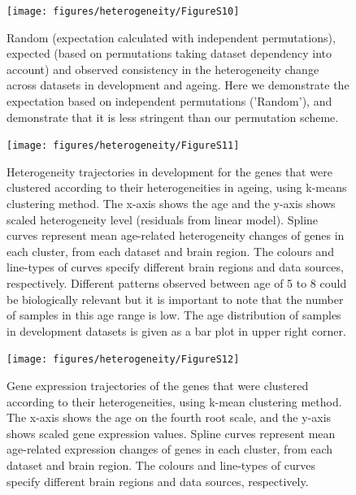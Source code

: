 \documentclass[12pt,twoside]{unicam}
\begin{document}
\begin{figure}

{\centering \texttt{[image: figures/heterogeneity/FigureS10]} 

}

\caption[Random, expected, and observed consistency in the heterogeneity change across datasets in development and ageing.]{Random (expectation calculated with independent permutations), expected (based on permutations taking dataset dependency into account) and observed consistency in the heterogeneity change across datasets in development and ageing. Here we demonstrate the expectation based on independent permutations ('Random'), and demonstrate that it is less stringent than our permutation scheme.}\label{fig:hetFigS10}
\end{figure}

\begin{figure}

{\centering \texttt{[image: figures/heterogeneity/FigureS11]} 

}

\caption[Heterogeneity trajectories in development for the genes that were clustered according to their heterogeneity levels in ageing.]{Heterogeneity trajectories in development for the genes that were clustered according to their heterogeneities in ageing, using k-means clustering method. The x-axis shows the age and the y-axis shows scaled heterogeneity level (residuals from linear model). Spline curves represent mean age-related heterogeneity changes of genes in each cluster, from each dataset and brain region. The colours and line-types of curves specify different brain regions and data sources, respectively. Different patterns observed between age of 5 to 8 could be biologically relevant but it is important to note that the number of samples in this age range is low. The age distribution of samples in development datasets is given as a bar plot in upper right corner.}\label{fig:hetFigS11}
\end{figure}

\begin{figure}

{\centering \texttt{[image: figures/heterogeneity/FigureS12]} 

}

\caption[Gene expression trajectories of the genes that were clustered according to their heterogeneity levels.]{Gene expression trajectories of the genes that were clustered according to their heterogeneities, using k-mean clustering method. The x-axis shows the age on the fourth root scale, and the y-axis shows scaled gene expression values. Spline curves represent mean age-related expression changes of genes in each cluster, from each dataset and brain region. The colours and line-types of curves specify different brain regions and data sources, respectively.}\label{fig:hetFigS12}
\end{figure}
\end{document}
